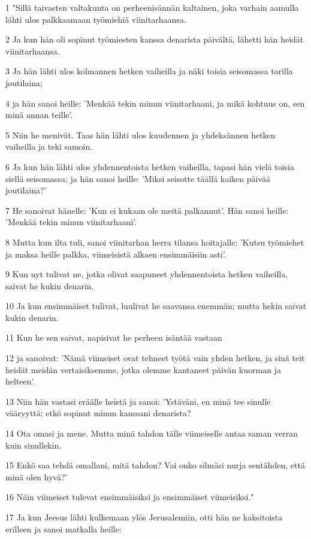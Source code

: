 \par 1 "Sillä taivasten valtakunta on perheenisännän kaltainen, joka varhain aamulla lähti ulos palkkaamaan työmiehiä viinitarhaansa.
\par 2 Ja kun hän oli sopinut työmiesten kanssa denarista päivältä, lähetti hän heidät viinitarhaansa.
\par 3 Ja hän lähti ulos kolmannen hetken vaiheilla ja näki toisia seisomassa torilla joutilaina;
\par 4 ja hän sanoi heille: 'Menkää tekin minun viinitarhaani, ja mikä kohtuus on, sen minä annan teille'.
\par 5 Niin he menivät. Taas hän lähti ulos kuudennen ja yhdeksännen hetken vaiheilla ja teki samoin.
\par 6 Ja kun hän lähti ulos yhdennentoista hetken vaiheilla, tapasi hän vielä toisia siellä seisomassa; ja hän sanoi heille: 'Miksi seisotte täällä kaiken päivää joutilaina?'
\par 7 He sanoivat hänelle: 'Kun ei kukaan ole meitä palkannut'. Hän sanoi heille: 'Menkää tekin minun viinitarhaani'.
\par 8 Mutta kun ilta tuli, sanoi viinitarhan herra tilansa hoitajalle: 'Kutsu työmiehet ja maksa heille palkka, viimeisistä alkaen ensimmäisiin asti'.
\par 9 Kun nyt tulivat ne, jotka olivat saapuneet yhdennentoista hetken vaiheilla, saivat he kukin denarin.
\par 10 Ja kun ensimmäiset tulivat, luulivat he saavansa enemmän; mutta hekin saivat kukin denarin.
\par 11 Kun he sen saivat, napisivat he perheen isäntää vastaan
\par 12 ja sanoivat: 'Nämä viimeiset ovat tehneet työtä vain yhden hetken, ja sinä teit heidät meidän vertaisiksemme, jotka olemme kantaneet päivän kuorman ja helteen'.
\par 13 Niin hän vastasi eräälle heistä ja sanoi: 'Ystäväni, en minä tee sinulle vääryyttä; etkö sopinut minun kanssani denarista?
\par 14 Ota omasi ja mene. Mutta minä tahdon tälle viimeiselle antaa saman verran kuin sinullekin.
\par 15 Enkö saa tehdä omallani, mitä tahdon? Vai onko silmäsi nurja sentähden, että minä olen hyvä?'
\par 16 Näin viimeiset tulevat ensimmäisiksi ja ensimmäiset viimeisiksi."
\par 17 Ja kun Jeesus lähti kulkemaan ylös Jerusalemiin, otti hän ne kaksitoista erilleen ja sanoi matkalla heille:
